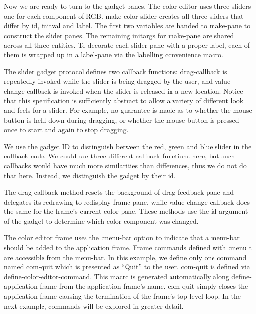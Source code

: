 \documentclass[twocolumn,a4paper]{article}
\newcommand {\code}[1]{{\sffamily #1}}
\let\class\code
\let\method\code
\let\variable\code
\let\macro\code
\let\keyword\code
\begin{document}
Now we are ready to turn to the gadget panes. The color editor uses
three sliders one for each component of RGB.
\method{make-color-slider} creates all three sliders that differ by
\variable{id}, \variable{initval} and \variable{label}. The first two
variables are handed to \method{make-pane} to construct the slider
panes. The remaining initargs for \method{make-pane} are shared across
all three entities. To decorate each slider-pane with a proper label,
each of them is wrapped up in a \class{label-pane} via the
\macro{labelling} convenience macro.

The slider gadget protocol defines two callback functions:
\method{drag-callback} is repeatedly invoked while the slider is being
dragged by the user, and \method{value-change-callback} is invoked
when the slider is released in a new location. Notice that this
specification is sufficiently abstract to allow a variety of different
look and feels for a slider. For example, no guarantee is made as to
whether the mouse button is held down during dragging, or whether the
mouse button is pressed once to start and again to stop dragging.

We use the gadget ID to distinguish between the red, green and blue
slider in the callback code. We could use three different callback
functions here, but such callbacks would have much more similarities
than differences, thus we do not do that here. Instead, we distinguish
the gadget by their \variable{id}.

The \method{drag-callback} method resets the background of
\variable{drag-feedback-pane} and delegates its redrawing to
\method{redisplay-frame-pane}, while \method{value-change-callback}
does the same for the frame's current color pane. These methods use
the \variable{id} argument of the gadget to determine which color
component was changed.

The color editor frame uses the \keyword{:menu-bar} option to indicate
that a menu-bar should be added to the application frame. Frame
commands defined with \code{:menu t} are accessible from the
menu-bar. In this example, we define only one command named
\code{com-quit} which is presented as ``Quit'' to the
user. \code{com-quit} is defined via
\macro{define-color-editor-command}. This macro is generated
automatically along \macro{define-application-frame} from the
application frame's name. \code{com-quit} simply closes the
application frame causing the termination of the frame's
top-level-loop. In the next example, commands will be explored in
greater detail.
\end{document}
